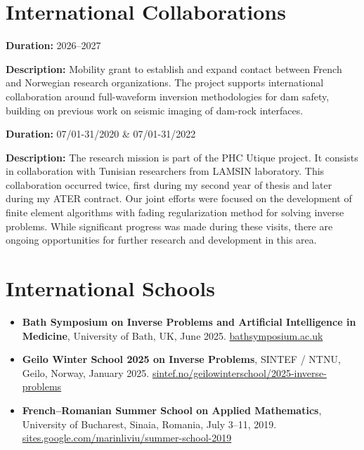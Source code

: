 \documentclass[10pt]{article} %
\begin{document}
\section*{International Collaborations}

{
\textbf{Duration:} 2026--2027

\textbf{Description:} Mobility grant to establish and expand contact between French and Norwegian research organizations. The project supports international collaboration around full-waveform inversion methodologies for dam safety, building on previous work on seismic imaging of dam-rock interfaces.
}

{
\textbf{Duration:} 07/01-31/2020 \& 07/01-31/2022

\textbf{Description:} The research mission is part of the PHC Utique project. It consists in collaboration with Tunisian researchers from LAMSIN laboratory. This collaboration occurred twice, first during my second year of thesis and later during my ATER contract. Our joint efforts were focused on the development of finite element algorithms with fading regularization method for solving inverse problems. While significant progress was made during these visits, there are ongoing opportunities for further research and development in this area.
}


\section*{International Schools}

\begin{itemize}

  \item \textbf{Bath Symposium on Inverse Problems and Artificial Intelligence in Medicine},  
  University of Bath, UK, June 2025.  
  \href{https://bathsymposium.ac.uk/symposium/inverse-problems-and-artificial-intelligence-in-medicine/}{bathsymposium.ac.uk}

  \item \textbf{Geilo Winter School 2025 on Inverse Problems},  
  SINTEF / NTNU, Geilo, Norway, January 2025.  
  \href{https://www.sintef.no/projectweb/geilowinterschool/2025-inverse-problems/}{sintef.no/geilowinterschool/2025-inverse-problems}


  \item \textbf{French–Romanian Summer School on Applied Mathematics},  
  University of Bucharest, Sinaia, Romania, July 3–11, 2019.  
  \href{https://sites.google.com/site/marinliviu/french-romanian-summer-school-on-applied-mathematics/6th-french-romanian-summer-school-on-applied-mathematics-3-11-july-2019}{sites.google.com/marinliviu/summer-school-2019}
\end{itemize}
\end{document}
